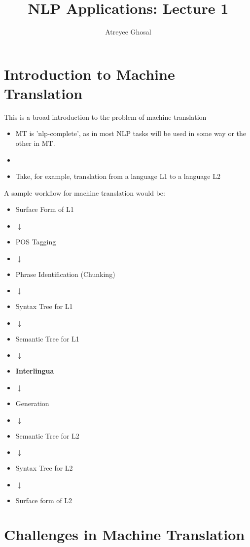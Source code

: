 \documentclass{article}
\begin{document}
\title{NLP Applications: Lecture 1}
\author{Atreyee Ghosal}


\section{Introduction to Machine Translation}

This is a broad introduction to the problem of machine translation

\begin{itemize}
\item
MT is 'nlp-complete', as in most NLP tasks will be used in some way or the other in MT.
\item
{}
\item
Take, for example, translation from a language L1 to a language L2
\end{itemize}

A sample workflow for machine translation would be:
\begin{itemize}
\item[]
Surface Form of L1
\item[]
$\downarrow$
\item[]
POS Tagging
\item[]
$\downarrow$
\item[]
Phrase Identification (Chunking)
\item[]
$\downarrow$
\item[]
Syntax Tree for L1
\item[]
$\downarrow$
\item[]
Semantic Tree for L1
\item[]
$\downarrow$
\item[]
\textbf{Interlingua}
\item[]
$\downarrow$
\item[]
Generation
\item[]
$\downarrow$
\item[]
Semantic Tree for L2
\item[]
$\downarrow$
\item[]
Syntax Tree for L2
\item[]
$\downarrow$
\item[]
Surface form of L2
\end{itemize}

\section{Challenges in Machine Translation}
\end{document}
